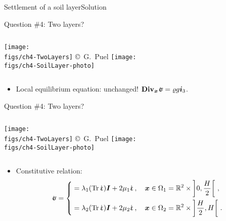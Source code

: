 \documentclass{beamer}
\newcommand{\trace}{\operatorname{Tr}}
\newcommand{\Rset}{\mathbb{R}}
\newcommand{\Id}{{\boldsymbol I}}
\newcommand{\xj}{x}
\newcommand{\xv}{{\boldsymbol\xj}}
\newcommand{\Div}{\mathbf{Div}}
\newcommand{\Divx}{{\Div_\xv}}
\renewcommand{\ij}{i}
\newcommand{\iv}{{\boldsymbol\ij}}
\newcommand{\medium}{\Omega}
\newcommand*{\strain}{\mbox{$\hspace{0.2em}\rotatebox[x=0pt,y=0.2pt]{90}{\rule{0.02\linewidth}{0.4pt}}\hspace{-0.23em}\upvarepsilon$}}
\newcommand{\roi}{\varrho}
\newcommand{\stress}{\mbox{$\hspace{0.3em}\rotatebox[x=0pt,y=0.2pt]{90}{\rule{0.017\linewidth}{0.4pt}}\hspace{-0.25em}\upsigma$}}
\begin{document}
\begin{frame}{Settlement of a soil layer}{Solution}

\begin{overprint}

\vskip-20pt
\begin{exampleblock}{Question \#4: Two layers?}
\begin{columns}[t]
\centering\texttt{[image: \\figs/ch4-TwoLayers]}
\vskip-7pt{\hspace{2.7truecm}\mbox{\tiny{\copyright\ G. Puel}}}
\vskip-85pt
\centering\texttt{[image: \\figs/ch4-SoilLayer-photo]}
\end{columns}
\begin{itemize}
\item Local equilibrium equation: unchanged! $\Divx\stress=\roi g\iv_3$.
\end{itemize}
\end{exampleblock}

\vskip-20pt
\begin{exampleblock}{Question \#4: Two layers?}
\begin{columns}[t]
\centering\texttt{[image: \\figs/ch4-TwoLayers]}
\vskip-7pt{\hspace{2.7truecm}\mbox{\tiny{\copyright\ G. Puel}}}
\vskip-85pt
\centering\texttt{[image: \\figs/ch4-SoilLayer-photo]}
\end{columns}
\begin{itemize}
\item Constitutive relation:
\begin{displaymath}
\stress=\left\{
\begin{split}
 &=\lambda_1(\trace\strain)\Id+2\mu_1\strain\,,\quad\xv\in\medium_1=\Rset^2\times\left]0,\frac{H}{2}\right[\,, \\
 &=\lambda_2(\trace\strain)\Id+2\mu_2\strain\,,\quad\xv\in\medium_2=\Rset^2\times\left]\frac{H}{2},H\right[\,. \\
\end{split}
\right.
\end{displaymath}
\end{itemize}
\end{exampleblock}


\end{overprint}
\end{frame}
\end{document}
